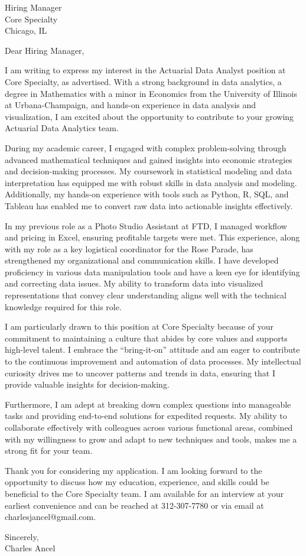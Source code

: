 \documentclass{letter}
\begin{document}
\begin{letter}{Hiring Manager\\Core Specialty\\Chicago, IL}

\opening{Dear Hiring Manager,}

I am writing to express my interest in the Actuarial Data Analyst position at Core Specialty, as advertised. With a strong background in data analytics, a degree in Mathematics with a minor in Economics from the University of Illinois at Urbana-Champaign, and hands-on experience in data analysis and visualization, I am excited about the opportunity to contribute to your growing Actuarial Data Analytics team.

During my academic career, I engaged with complex problem-solving through advanced mathematical techniques and gained insights into economic strategies and decision-making processes. My coursework in statistical modeling and data interpretation has equipped me with robust skills in data analysis and modeling. Additionally, my hands-on experience with tools such as Python, R, SQL, and Tableau has enabled me to convert raw data into actionable insights effectively.

In my previous role as a Photo Studio Assistant at FTD, I managed workflow and pricing in Excel, ensuring profitable targets were met. This experience, along with my role as a key logistical coordinator for the Rose Parade, has strengthened my organizational and communication skills. I have developed proficiency in various data manipulation tools and have a keen eye for identifying and correcting data issues. My ability to transform data into visualized representations that convey clear understanding aligns well with the technical knowledge required for this role.

I am particularly drawn to this position at Core Specialty because of your commitment to maintaining a culture that abides by core values and supports high-level talent. I embrace the “bring-it-on” attitude and am eager to contribute to the continuous improvement and automation of data processes. My intellectual curiosity drives me to uncover patterns and trends in data, ensuring that I provide valuable insights for decision-making.

Furthermore, I am adept at breaking down complex questions into manageable tasks and providing end-to-end solutions for expedited requests. My ability to collaborate effectively with colleagues across various functional areas, combined with my willingness to grow and adapt to new techniques and tools, makes me a strong fit for your team.

Thank you for considering my application. I am looking forward to the opportunity to discuss how my education, experience, and skills could be beneficial to the Core Specialty team. I am available for an interview at your earliest convenience and can be reached at 312-307-7780 or via email at charlesjancel@gmail.com.

\begin{flushleft}
Sincerely,\\
Charles Ancel
\end{flushleft}

\end{letter}
\end{document}

